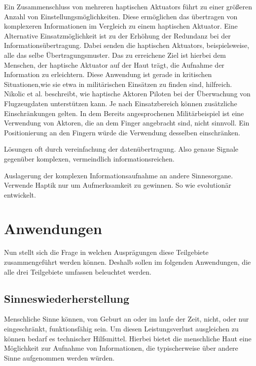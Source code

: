 \documentclass{llncs}					%
\begin{document}
Ein Zusammenschluss von mehreren haptischen \glspl{Aktuator} führt zu einer größeren Anzahl von Einstellungsmöglichkeiten. Diese ermöglichen das übertragen von komplexeren Informationen im Vergleich zu einem haptischen \gls{Aktuator}. Eine Alternative Einsatzmöglichkeit ist zu der Erhöhung der Redundanz bei der Informationsübertragung. Dabei senden die haptischen \glspl{Aktuator}, beispielsweise, alle das selbe Übertragungsmuster. Das zu erreichene Ziel ist hierbei dem Menschen, der haptische \gls{Aktuator} auf der Haut trägt, die Aufnahme der Information zu erleichtern. Diese Anwendung ist gerade in kritischen Situationen,wie sie etwa in militärischen Einsätzen zu finden sind, hilfreich\cite{nikolic1998multisensory}. Nikolic et al. \cite{nikolic1998multisensory} beschreibt, wie haptische Aktoren Piloten bei der Überwachung von Flugzeugdaten unterstützen kann.
Je nach Einsatzbereich können zusätzliche Einschränkungen gelten. In dem Bereits angesprochenen Militärbeispiel ist eine Verwendung von Aktoren, die an dem Finger angebracht sind, nicht sinnvoll. Ein Positionierung an den Fingern würde die Verwendung desselben einschränken.

Lösungen oft durch vereinfachung der datenübertragung. Also genaue Signale gegenüber komplexen, vermeindlich informationsreichen.

Auslagerung der komplexen Informationsaufnahme an andere Sinnesorgane. Verwende Haptik nur um Aufmerksamkeit zu gewinnen. So wie evolutionär entwickelt. \cite{doi:10.1518/001872008X250638}

\newpage
\section{Anwendungen}
Nun stellt sich die Frage in welchen Ausprägungen diese Teilgebiete zusammengeführt werden können. Deshalb sollen im folgenden Anwendungen, die alle drei Teilgebiete umfassen beleuchtet werden.

\subsection{Sinneswiederherstellung}
Menschliche Sinne können, von Geburt an oder im laufe der Zeit, nicht, oder nur eingeschränkt, funktionsfähig sein. Um diesen Leistungsverlust ausgleichen zu können bedarf es technischer Hilfsmittel. Hierbei bietet die menschliche Haut eine Möglichkeit zur Aufnahme von Informationen, die typischerweise über andere Sinne aufgenommen werden würden.
\end{document}
